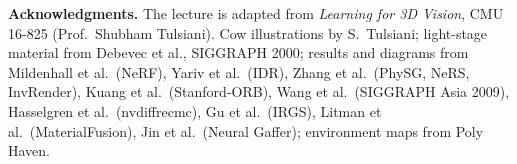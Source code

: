 \documentclass[11pt,a4paper]{article}
\theoremstyle{definition}
\theoremstyle{plain}
\theoremstyle{remark}
\begin{document}
\bigskip
\begin{small}
\textbf{Acknowledgments.} The lecture is adapted from \emph{Learning for 3D Vision}, CMU 16-825 (Prof.\ Shubham Tulsiani). Cow illustrations by S.~Tulsiani; light-stage material from Debevec et al., SIGGRAPH 2000; results and diagrams from Mildenhall et al.\ (NeRF), Yariv et al.\ (IDR), Zhang et al.\ (PhySG, NeRS, InvRender), Kuang et al.\ (Stanford-ORB), Wang et al.\ (SIGGRAPH Asia 2009), Hasselgren et al.\ (nvdiffrecmc), Gu et al.\ (IRGS), Litman et al.\ (MaterialFusion), Jin et al.\ (Neural Gaffer); environment maps from Poly Haven.
\end{small}
\end{document}
